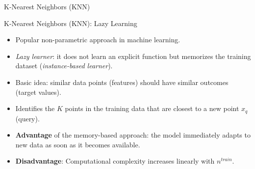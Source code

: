 \documentclass[11pt]{beamer}
\begin{document}
\begin{frame}
	\begin{center}
		\Large
		K-Nearest Neighbors (KNN)
	\end{center}
\end{frame}

\begin{frame}{K-Nearest Neighbors (KNN): Lazy Learning}
    \begin{itemize}
        \item Popular non-parametric approach in machine learning.
        \item \textit{Lazy learner}: it does not learn an explicit function but memorizes the training dataset (\textit{instance-based learner}).
        \item Basic idea: similar data points (features) should have similar outcomes (target values).
        \item Identifies the $K$ points in the training data that are closest to a new point $x_q$ (query).
        \item \textbf{Advantage} of the memory-based approach: the model immediately adapts to new data as soon as it becomes available.
        \item \textbf{Disadvantage}: Computational complexity increases linearly with $n^{train}$.
    \end{itemize}
\end{frame}
\end{document}
